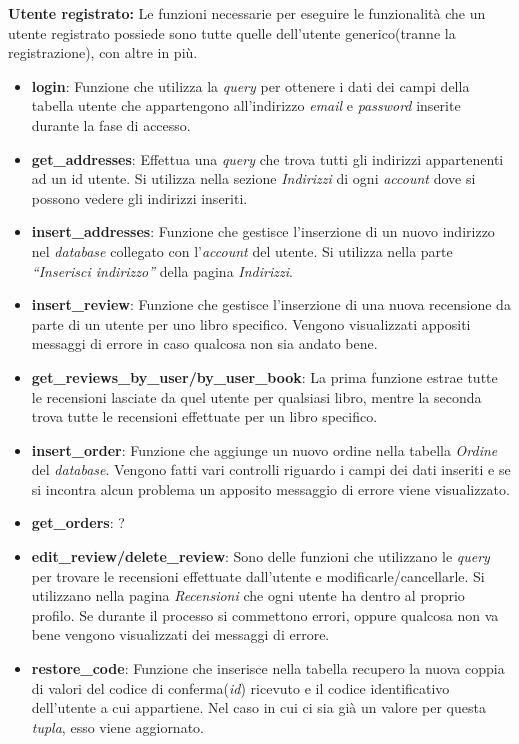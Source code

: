 \textbf{Utente registrato:} Le funzioni necessarie per eseguire le funzionalità che un utente registrato possiede sono tutte quelle dell'utente generico(tranne la registrazione), con altre in più.
\begin{itemize}
	\item \textbf{login}: Funzione che utilizza la \textit{query} per ottenere i dati dei campi della tabella utente che appartengono all’indirizzo \textit{email} e \textit{password} inserite durante la fase di accesso.
	\item \textbf{get\_addresses}: Effettua una \textit{query} che trova tutti gli indirizzi appartenenti ad un id utente. Si utilizza nella sezione \textit{Indirizzi} di ogni \textit{account} dove si possono vedere gli indirizzi inseriti.
	\item \textbf{insert\_addresses}: Funzione che gestisce l’inserzione di un nuovo indirizzo nel \textit{database} collegato con l’\textit{account} del utente. Si utilizza nella parte \textit{“Inserisci indirizzo”} della pagina \textit{Indirizzi}.
	\item \textbf{insert\_review}: Funzione che gestisce l’inserzione di una nuova recensione da parte di un utente per uno libro specifico. Vengono visualizzati appositi messaggi di errore in caso qualcosa non sia andato bene.
	\item \textbf{get\_reviews\_by\_user/by\_user\_book}: La prima funzione estrae tutte le recensioni lasciate da quel utente per qualsiasi libro, mentre la seconda trova tutte le recensioni effettuate per un libro specifico.
	\item \textbf{insert\_order}: Funzione che aggiunge un nuovo ordine nella tabella \textit{Ordine} del \textit{database}. Vengono fatti vari controlli riguardo i campi dei dati inseriti e se si incontra alcun problema un apposito messaggio di errore viene visualizzato.
	\item \textbf{get\_orders}: ?
	\item \textbf{edit\_review/delete\_review}: Sono delle funzioni che utilizzano le \textit{query} per trovare le recensioni effettuate dall’utente e modificarle/cancellarle. Si utilizzano nella pagina \textit{Recensioni} che ogni utente ha dentro al proprio profilo. Se durante il processo si commettono errori, oppure qualcosa non va bene vengono visualizzati dei messaggi di errore.
	\item \textbf{restore\_code}: Funzione che inserisce nella tabella recupero la nuova coppia di valori del codice di conferma(\textit{id}) ricevuto e il codice identificativo dell’utente a cui appartiene. Nel caso in cui ci sia già un valore per questa \textit{tupla}, esso viene aggiornato.

\end{itemize}
